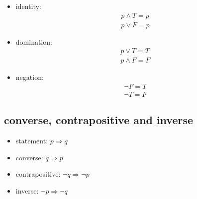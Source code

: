 \documentclass{article}
\begin{document}
\begin{itemize}
    \item identity: \begin{gather*}
              p \land T = p\\
              p \lor F = p
          \end{gather*}
    \item domination: \begin{gather*}
              p \lor T = T\\
              p \land F = F
          \end{gather*}
    \item negation: \begin{gather*}
              \lnot F = T\\
              \lnot T = F
          \end{gather*}

\end{itemize}
\subsection{converse, contrapositive and inverse}

\begin{itemize}
    \item statement: $p \Rightarrow  q$
    \item converse: $q \Rightarrow p$
    \item contrapositive: $\lnot q \Rightarrow \lnot p$
    \item inverse: $\lnot p \Rightarrow \lnot q$
\end{itemize}
\end{document}
